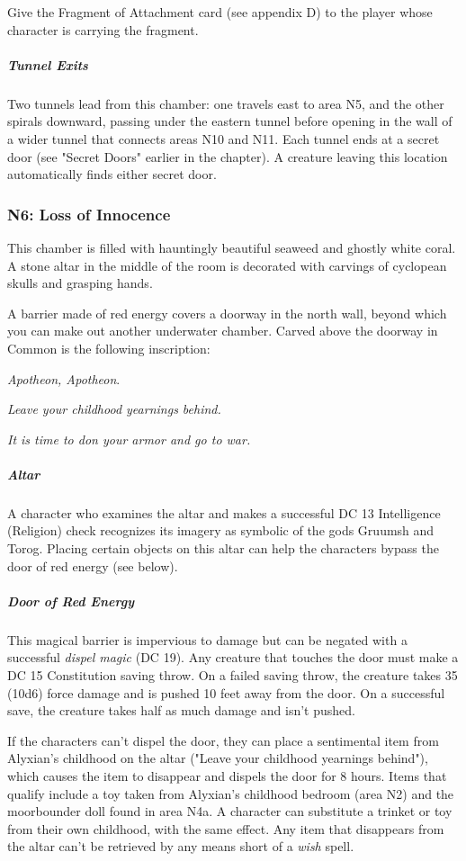 \documentclass[10pt,a4paper,twoside,fancy,bg=print,twocolumn,openany,nodeprecatedcode]{dndbook}
\begin{document}
Give the Fragment of Attachment card (see appendix D) to the player whose character is carrying the fragment.

\subparagraph{Tunnel Exits}
Two tunnels lead from this chamber: one travels east to area N5, and the other spirals downward, passing under the eastern tunnel before opening in the wall of a wider tunnel that connects areas N10 and N11. Each tunnel ends at a secret door (see "Secret Doors" earlier in the chapter). A creature leaving this location automatically finds either secret door.

\subsubsection{N6: Loss of Innocence}
\begin{DndReadAloud}{}
This chamber is filled with hauntingly beautiful seaweed and ghostly white coral. A stone altar in the middle of the room is decorated with carvings of cyclopean skulls and grasping hands.

A barrier made of red energy covers a doorway in the north wall, beyond which you can make out another underwater chamber. Carved above the doorway in Common is the following inscription:

\textit{Apotheon, Apotheon}.

\textit{Leave your childhood yearnings behind.}

\textit{It is time to don your armor and go to war.}

\end{DndReadAloud}

\subparagraph{Altar}
A character who examines the altar and makes a successful DC 13 Intelligence (Religion) check recognizes its imagery as symbolic of the gods Gruumsh and Torog. Placing certain objects on this altar can help the characters bypass the door of red energy (see below).

\subparagraph{Door of Red Energy}
This magical barrier is impervious to damage but can be negated with a successful \textit{dispel magic} (DC 19). Any creature that touches the door must make a DC 15 Constitution saving throw. On a failed saving throw, the creature takes 35 (10d6) force damage and is pushed 10 feet away from the door. On a successful save, the creature takes half as much damage and isn't pushed.

If the characters can't dispel the door, they can place a sentimental item from Alyxian's childhood on the altar ("Leave your childhood yearnings behind"), which causes the item to disappear and dispels the door for 8 hours. Items that qualify include a toy taken from Alyxian's childhood bedroom (area N2) and the moorbounder doll found in area N4a. A character can substitute a trinket or toy from their own childhood, with the same effect. Any item that disappears from the altar can't be retrieved by any means short of a \textit{wish} spell.
\end{document}

